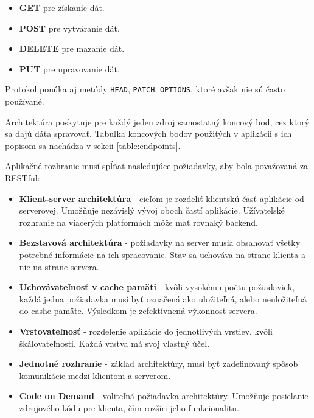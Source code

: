     \begin{itemize}
        \item\textbf{GET} pre získanie dát.
        \item\textbf{POST} pre vytváranie dát.
        \item\textbf{DELETE} pre mazanie dát.
        \item\textbf{PUT} pre upravovanie dát.
    \end{itemize}
    
Protokol ponúka aj metódy \texttt{HEAD}, \texttt{PATCH}, \texttt{OPTIONS}, ktoré avšak nie sú často používané.

\vspace{\baselineskip}

Architektúra poskytuje pre každý jeden zdroj samostatný koncový bod, cez ktorý sa dajú dáta spravovať. Tabuľka koncových bodov použitých v aplikácii s ich popisom sa nachádza v sekcii \ref{table:endpoints}.

Aplikačné rozhranie musí spĺňať nasledujúce požiadavky, aby bola považovaná za RESTful:

    \begin{itemize}
        \item\textbf{Klient-server architektúra} - cieľom je rozdeliť klientskú časť aplikácie od serverovej. Umožňuje nezávislý vývoj oboch častí aplikácie. Užívateľské rozhranie na viacerých platformách môže mať rovnaký backend.
        \item\textbf{Bezstavová architektúra} - požiadavky na server musia obsahovať všetky potrebné informácie na ich spracovanie. Stav sa uchováva na strane klienta a nie na strane servera.
        \item\textbf{Uchovávateľnosť v cache pamäti} - kvôli vysokému počtu požiadaviek, každá jedna požiadavka musí byť označená ako uložiteľná, alebo neuložiteľná do cashe pamäte. Výsledkom je zefektívnená výkonnosť servera.
        \item\textbf{Vrstovateľnosť} - rozdelenie aplikácie do jednotlivých vrstiev, kvôli škálovateľnosti. Každá vrstva má svoj vlastný účel.
        \item\textbf{Jednotné rozhranie} - základ architektúry, musí byť zadefinovaný spôsob komunikácie medzi klientom a serverom.
        \item\textbf{Code on Demand} - voliteľná požiadavka architektúry. Umožňuje posielanie zdrojového kódu pre klienta, čím rozšíri jeho funkcionalitu.
    \end{itemize}

